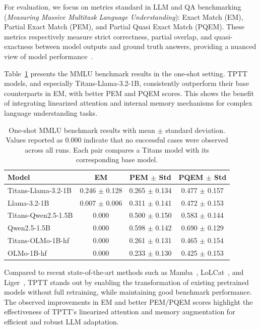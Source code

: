 \documentclass[10pt,a4paper]{article}
\begin{document}
For evaluation, we focus on metrics standard in LLM and QA benchmarking (\textit{Measuring Massive Multitask Language Understanding}): Exact Match (EM), Partial Exact Match (PEM), and Partial Quasi Exact Match (PQEM). These metrics respectively measure strict correctness, partial overlap, and quasi-exactness between model outputs and ground truth answers, providing a nuanced view of model performance~\cite{hendrycks2020measuring}.

Table~\ref{tab:mmlu-results} presents the MMLU benchmark results in the one-shot setting. TPTT models, and especially Titans-Llama-3.2-1B, consistently outperform their base counterparts in EM, with better PEM and PQEM scores. This shows the benefit of integrating linearized attention and internal memory mechanisms for complex language understanding tasks.

\begin{table}[h!]
    \centering
    \renewcommand{\arraystretch}{1.2}
    \begin{tabular}{|l|c|c|c|}
    \hline
    Model & EM & PEM $\pm$ Std & PQEM $\pm$ Std \\
    \hline
    Titans-Llama-3.2-1B & 0.246 $\pm$ 0.128 & 0.265 $\pm$ 0.134 & 0.477 $\pm$ 0.157 \\
    Llama-3.2-1B        & 0.007 $\pm$ 0.006 & 0.311 $\pm$ 0.141 & 0.472 $\pm$ 0.153 \\
    \hline
    Titans-Qwen2.5-1.5B & 0.000              & 0.500 $\pm$ 0.150 & 0.583 $\pm$ 0.144 \\
    Qwen2.5-1.5B        & 0.000              & 0.598 $\pm$ 0.142 & 0.690 $\pm$ 0.129 \\
    \hline
    Titans-OLMo-1B-hf   & 0.000              & 0.261 $\pm$ 0.131 & 0.465 $\pm$ 0.154 \\
    OLMo-1B-hf          & 0.000              & 0.233 $\pm$ 0.130 & 0.425 $\pm$ 0.153 \\
    \hline
    \end{tabular}
    \caption{One-shot MMLU benchmark results with mean $\pm$ standard deviation. 
    Values reported as 0.000 indicate that no successful cases were observed across all runs. 
    Each pair compares a Titans model with its corresponding base model.}
    \label{tab:mmlu-results}
\end{table}


Compared to recent state-of-the-art methods such as Mamba~\cite{gu2023mamba}, LoLCat~\cite{zhang2024lolcats}, and Liger~\cite{lan2025liger}, TPTT stands out by enabling the transformation of existing pretrained models without full retraining, while maintaining good benchmark performance. The observed improvements in EM and better PEM/PQEM scores highlight the effectiveness of TPTT's linearized attention and memory augmentation for efficient and robust LLM adaptation.
\end{document}
